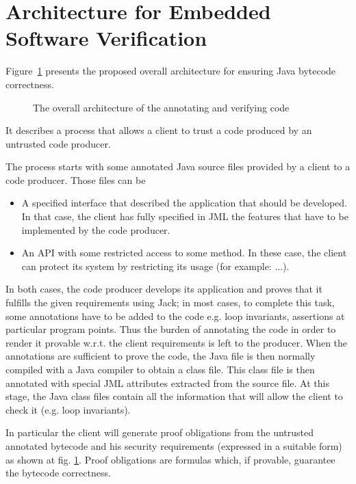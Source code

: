 \section{Architecture for Embedded Software Verification}
\label{architecture_s}	
Figure~\ref{architecture} presents the proposed overall architecture for ensuring Java bytecode correctness. 
\begin{figure}[ht!]
\begin{center}
\caption{The overall architecture of the annotating and verifying code}
\label{architecture}
\end{center}
\end{figure}
It describes a process that allows a client to trust a code produced by an untrusted code producer.

The process starts with some annotated Java source files provided by a client to a code producer. Those files can be
\begin{itemize}
\item A specified interface that described the application that should be developed. In that case, the client has fully specified in JML the features that have to be implemented by the code producer.
\item An API with some restricted access to some method. In these case, the client can protect its system by restricting its usage (for example: ...). 
\end{itemize}
In both cases, the code producer develops its application and proves that it fulfills the given requirements using Jack; 
in most cases, to complete this task, some annotations have to be added to the code 
e.g. loop invariants, assertions at particular program points. Thus the burden of annotating the code 
in order to render it provable w.r.t. the client requirements is left to the producer. 
When the annotations are sufficient to prove the code, 
the Java file is then normally compiled with a Java compiler to obtain a 
class file. 
This class file is then annotated with special JML attributes extracted from the source file. 
At this stage, the Java class files contain all the information that will allow the client to check it (e.g. loop invariants). 
 
In particular 
the client will generate proof obligations from the untrusted annotated bytecode and his security requirements 
(expressed in a suitable form)
 as shown at fig. \ref{architecture}. Proof obligations are formulas which, if provable, guarantee the bytecode correctness.

